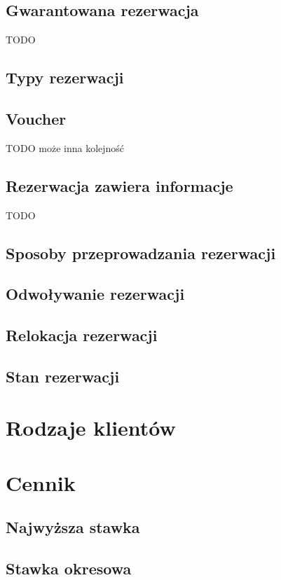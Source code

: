 \documentclass[a4paper,onecolumn,oneside,11pt,wide,floatssmall]{mwrep}
\theoremstyle{definition}
\theoremstyle{plain}%
\theoremstyle{remark}
\begin{document}
\subsection{Gwarantowana rezerwacja}
TODO

\subsection{Typy rezerwacji}

\subsection{Voucher}
TODO może inna kolejność

\subsection{Rezerwacja zawiera informacje}
TODO

\subsection{Sposoby przeprowadzania rezerwacji}

\subsection{Odwoływanie rezerwacji}

\subsection{Relokacja rezerwacji}

\subsection{Stan rezerwacji}

\section{Rodzaje klientów}

\section{Cennik}

\subsection{Najwyższa stawka}

\subsection{Stawka okresowa}
\end{document}
